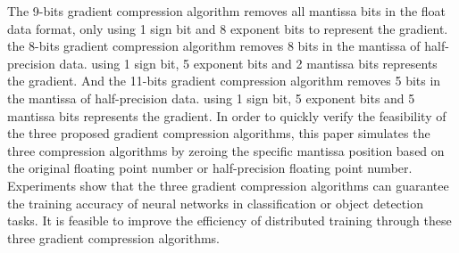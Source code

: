 \begin{eabstract}
The 9-bits gradient compression algorithm removes all mantissa bits in the float data format, only using 1 sign bit and 8 exponent bits to represent the gradient. the 8-bits gradient compression algorithm removes 8 bits in the mantissa of half-precision data. using 1 sign bit, 5 exponent bits and 2 mantissa bits represents the gradient. And the 11-bits gradient compression algorithm removes 5 bits in the mantissa of half-precision data. using 1 sign bit, 5 exponent bits and 5 mantissa bits represents the gradient.
 In order to quickly verify the feasibility of the three proposed gradient compression algorithms, this paper simulates the three compression algorithms by zeroing the specific mantissa position based on the original floating point number or half-precision floating point number. Experiments show that the three gradient compression algorithms can guarantee the training accuracy of neural networks in classification or object detection tasks. It is feasible to improve the efficiency of distributed training through these three gradient compression algorithms.

\end{eabstract}

